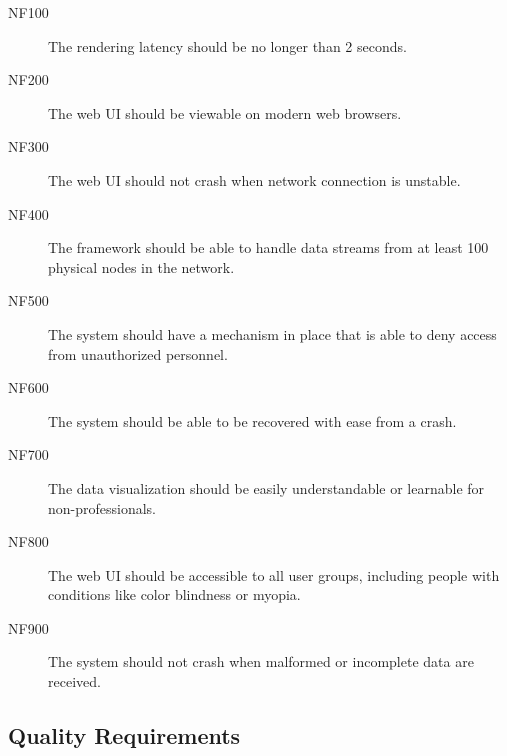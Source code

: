 \documentclass[twoside, english, draft]{Pflichtenheft}
\begin{document}
\begin{description}

	\item[NF100]
	      The rendering latency should be no longer than 2 seconds.

	\item[NF200]
	      The web UI should be viewable on modern web browsers.

	\item[NF300]
	      The web UI should not crash when network connection is unstable.

	\item[NF400]
	      The framework should be able to handle \glspl{data stream} from at least 100 physical nodes in the network.

	\item[NF500]
	      The system should have a mechanism in place that is able to deny access from unauthorized personnel.

	\item[NF600]
	      The system should be able to be recovered with ease from a crash.

	\item[NF700]
	      The data visualization should be easily understandable or learnable for non-professionals.

	\item[NF800]
	      The web UI should be accessible to all user groups, including people with conditions like color blindness or myopia.

	\item[NF900]
	      The system should not crash when malformed or incomplete data are received.

\end{description}
\subsection{Quality Requirements}
\end{document}
